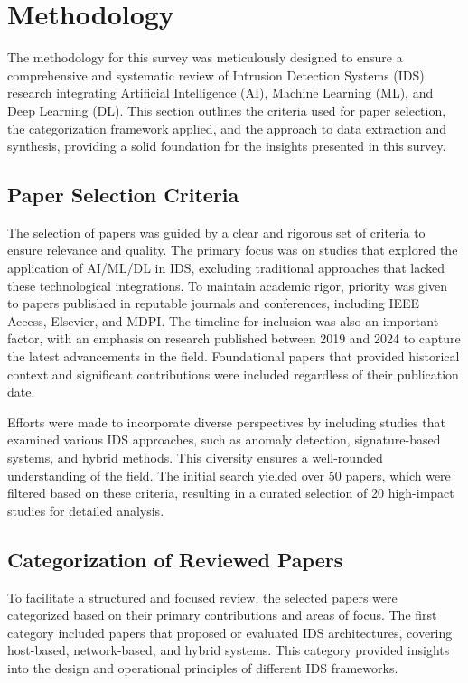 \section{Methodology}
\label{Methodology}

The methodology for this survey was meticulously designed to ensure a comprehensive and systematic review of Intrusion Detection Systems (IDS) research integrating Artificial Intelligence (AI), Machine Learning (ML), and Deep Learning (DL). This section outlines the criteria used for paper selection, the categorization framework applied, and the approach to data extraction and synthesis, providing a solid foundation for the insights presented in this survey.


\subsection{Paper Selection Criteria}
The selection of papers was guided by a clear and rigorous set of criteria to ensure relevance and quality. The primary focus was on studies that explored the application of AI/ML/DL in IDS, excluding traditional approaches that lacked these technological integrations. To maintain academic rigor, priority was given to papers published in reputable journals and conferences, including IEEE Access, Elsevier, and MDPI. The timeline for inclusion was also an important factor, with an emphasis on research published between 2019 and 2024 to capture the latest advancements in the field. Foundational papers that provided historical context and significant contributions were included regardless of their publication date.

Efforts were made to incorporate diverse perspectives by including studies that examined various IDS approaches, such as anomaly detection, signature-based systems, and hybrid methods. This diversity ensures a well-rounded understanding of the field. The initial search yielded over 50 papers, which were filtered based on these criteria, resulting in a curated selection of 20 high-impact studies for detailed analysis.




\subsection{Categorization of Reviewed Papers}
To facilitate a structured and focused review, the selected papers were categorized based on their primary contributions and areas of focus. The first category included papers that proposed or evaluated IDS architectures, covering host-based, network-based, and hybrid systems. This category provided insights into the design and operational principles of different IDS frameworks.

